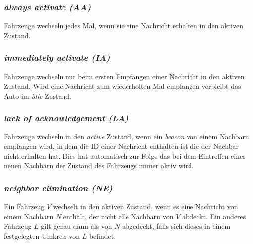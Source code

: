 \documentclass[english,runningheads,a4paper]{llncs}[2018/03/10]
\begin{document}
\subsubsection{\textit{always activate (AA)}}
Fahrzeuge wechseln jedes Mal, wenn sie eine Nachricht erhalten in den aktiven Zustand.
\subsubsection{\textit{immediately activate (IA)}}
Fahrzeuge wechseln nur beim ersten Empfangen einer Nachricht in den aktiven Zustand.
Wird eine Nachricht zum wiederholten Mal empfangen verbleibt das Auto im \textit{idle} Zustand.
\subsubsection{\textit{lack of acknowledgement (LA)}}
Fahrzeuge wechseln in den \textit{active} Zustand, wenn ein \textit{beacon} von einem Nachbarn empfangen wird, in dem die ID einer Nachricht enthalten ist die der Nachbar nicht erhalten hat.
Dies hat automatisch zur Folge das bei dem Eintreffen eines neuen Nachbarn der Zustand des Fahrzeugs immer aktiv wird.
\subsubsection{\textit{neighbor elimination (NE)}}
Ein Fahrzeug $V$ wechselt in den aktiven Zustand, wenn es eine Nachricht von einem Nachbarn $N$ enthält, der nicht alle Nachbarn von $V$ abdeckt.
Ein anderes Fahrzeug $L$ gilt genau dann als von $N$ abgedeckt, falls sich dieses in einem festgelegten Umkreis von $L$ befindet.
\end{document}
